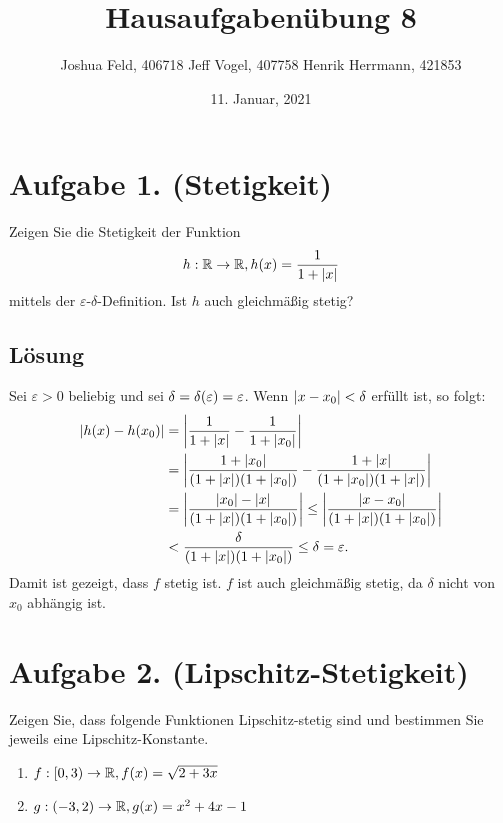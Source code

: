 \documentclass[german,12pt]{homework}
\title{Hausaufgabenübung 8}
\author{Joshua Feld, 406718 \quad Jeff Vogel, 407758 \quad Henrik Herrmann, 421853}
\date{11. Januar, 2021}
\institute{RWTH Aachen University\\Center for Computational Engineering Science}
\newcommand{\RR}{\mathbb{R}}
\DeclarePairedDelimiter{\absolute}{\lvert}{\rvert}
\DeclarePairedDelimiter{\enbrace}{(}{)}
\begin{document}
    \maketitle

    \section*{Aufgabe 1. (Stetigkeit)}

    \begin{problem}
        Zeigen Sie die Stetigkeit der Funktion
        \[h: \RR \to \RR, h\enbrace*{x} = \frac{1}{1 + \lvert{x}\rvert}\]
        mittels der \(\varepsilon\)-\(\delta\)-Definition. Ist \(h\) auch gleichmäßig stetig?
    \end{problem}

    \subsection*{Lösung} Sei \(\varepsilon > 0\) beliebig und sei \(\delta = \delta\enbrace*{\varepsilon} = \varepsilon\). Wenn \(\absolute*{x - x_0} < \delta\) erfüllt ist, so folgt:
    \begin{align*}
        \absolute*{h\enbrace*{x} - h\enbrace*{x_0}} &= \absolute*{\frac{1}{1 + \absolute*{x}} - \frac{1}{1 + \absolute*{x_0}}}\\
        &= \absolute*{\frac{1 + \absolute*{x_0}}{\enbrace*{1 + \absolute*{x}}\enbrace*{1 + \absolute*{x_0}}} - \frac{1 + \absolute*{x}}{\enbrace*{1 + \absolute*{x_0}}\enbrace*{1 + \absolute*{x}}}}\\
        &= \absolute*{\frac{\absolute*{x_0} - \absolute*{x}}{\enbrace*{1 + \absolute*{x}}\enbrace*{1 + \absolute*{x_0}}}} \le \absolute*{\frac{\absolute*{x - x_0}}{\enbrace*{1 + \absolute*{x}}\enbrace*{1 + \absolute*{x_0}}}}\\
        &< \frac{\delta}{\enbrace*{1 + \absolute*{x}}\enbrace*{1 + \absolute*{x_0}}} \le \delta = \varepsilon.
    \end{align*}
    Damit ist gezeigt, dass \(f\) stetig ist. \(f\) ist auch gleichmäßig stetig, da \(\delta\) nicht von \(x_0\) abhängig ist.

    \section*{Aufgabe 2. (Lipschitz-Stetigkeit)}

    \begin{problem}
        Zeigen Sie, dass folgende Funktionen Lipschitz-stetig sind und bestimmen
        Sie jeweils eine Lipschitz-Konstante.
        \begin{enumerate}
            \item \(f: \left[0, 3\right) \to \RR, f\enbrace*{x} = \sqrt{2 + 3x}\)
            \item \(g: \enbrace*{-3, 2} \to \RR, g\enbrace*{x} = x^2 + 4x - 1\)
        \end{enumerate}
    \end{problem}
\end{document}
